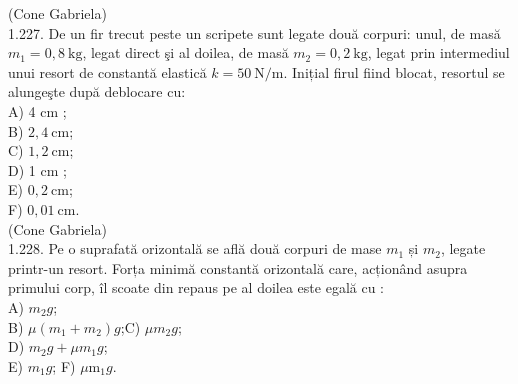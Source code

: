 {(Cone Gabriela)\\
1.227. De un fir trecut peste un scripete sunt legate două corpuri: unul, de masă $m_{1}=0,8 \mathrm{~kg}$, legat direct şi al doilea, de masă $m_{2}=0,2 \mathrm{~kg}$, legat prin intermediul unui resort de constantă elastică $k=50 \mathrm{~N} / \mathrm{m}$. Inițial firul fiind blocat, resortul se alungeşte după deblocare cu:\\
A) 4 cm ;\\
B) $2,4 \mathrm{~cm}$;\\
C) $1,2 \mathrm{~cm}$;\\
D) 1 cm ;\\
E) $0,2 \mathrm{~cm}$;\\
F) $0,01 \mathrm{~cm}$.\\
(Cone Gabriela)\\
1.228. Pe o suprafată orizontală se află două corpuri de mase $m_{1}$ și $m_{2}$, legate printr-un resort. Forța minimă constantă orizontală care, acționând asupra primului corp, îl scoate din repaus pe al doilea este egală cu :\\
A) $m_{2} g$;\\
B) $\mu\left(m_{1}+m_{2}\right) g$;C) $\mu m_{2} g$;\\
D) $m_{2} g+\mu m_{1} g$;\\
E) $m_{1} g$; F) $\mu \mathrm{m}_{1} g$.

}
